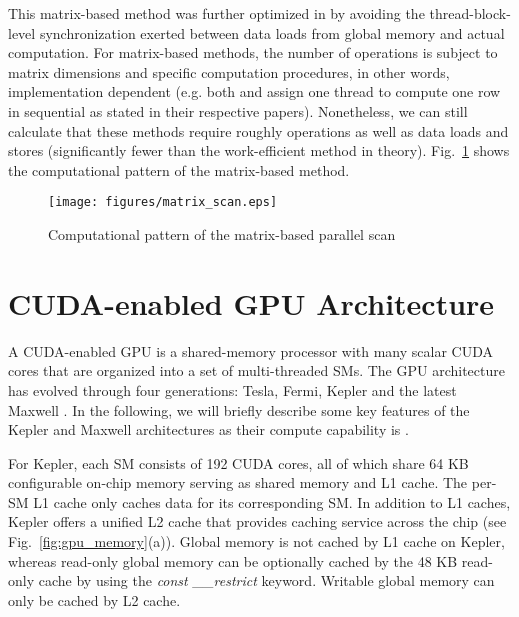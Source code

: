 \documentclass[article]{elsarticle}
\renewcommand{\hl}[1]{#1}
\begin{document}
{This matrix-based method was further optimized in \cite{yan2013streamscan} by avoiding the thread-block-level synchronization exerted between data loads from global memory and actual computation. For matrix-based methods, the number of  operations is subject to matrix dimensions and specific computation procedures, in other words, implementation dependent (e.g. both \cite{dotsenko2008fast}  and \cite{yan2013streamscan} assign one thread to compute one row in sequential \hl{as stated in their respective papers}). Nonetheless, we can still calculate that these methods require roughly   operations as well as  data loads and  stores (significantly fewer than the work-efficient method in theory). Fig.~\ref{fig:matrix_scan} shows the computational pattern of the matrix-based method.
\begin{figure}[!h]
\centering
\texttt{[image: figures/matrix\_scan.eps]}
\caption{Computational pattern of the matrix-based parallel scan}
\label{fig:matrix_scan}
\end{figure}
\section{CUDA-enabled GPU Architecture}
A CUDA-enabled GPU is a shared-memory processor with many scalar CUDA cores that are organized into a set of multi-threaded SMs. The GPU architecture has evolved through four generations: Tesla, Fermi, Kepler \cite{kepler} and the latest Maxwell \cite{maxwell}. In the following, we will briefly describe some key features of the Kepler and Maxwell architectures as their compute capability is .

For Kepler, each SM consists of 192 CUDA cores, all of which share 64 KB configurable on-chip memory serving as shared memory and L1 cache. The per-SM L1 cache only caches data for its corresponding SM. In addition to L1 caches, Kepler offers a unified L2 cache that provides caching service across the chip (see Fig.~\ref{fig:gpu_memory}(a)). Global memory is not cached by L1 cache on Kepler, whereas read-only global memory can be optionally cached by the 48 KB read-only cache by using the \textit{const \_\_restrict} keyword. Writable global memory can only be cached by L2 cache.

}
\end{document}

